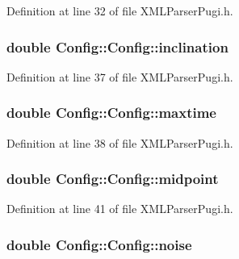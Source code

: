 Definition at line 32 of file XMLParserPugi.h.

\hypertarget{classConfig_1_1Config_adb71ce5d055b439fa0c3641c6400327e}{
\subsubsection[{inclination}]{\setlength{\rightskip}{0pt plus 5cm}double {\bf Config::Config::inclination}}}
\label{classConfig_1_1Config_adb71ce5d055b439fa0c3641c6400327e}


Definition at line 37 of file XMLParserPugi.h.

\hypertarget{classConfig_1_1Config_a3dcb214d120167f7bb6902892942d831}{
\subsubsection[{maxtime}]{\setlength{\rightskip}{0pt plus 5cm}double {\bf Config::Config::maxtime}}}
\label{classConfig_1_1Config_a3dcb214d120167f7bb6902892942d831}


Definition at line 38 of file XMLParserPugi.h.

\hypertarget{classConfig_1_1Config_ada14b015b08c65e217d223fead656748}{
\subsubsection[{midpoint}]{\setlength{\rightskip}{0pt plus 5cm}double {\bf Config::Config::midpoint}}}
\label{classConfig_1_1Config_ada14b015b08c65e217d223fead656748}


Definition at line 41 of file XMLParserPugi.h.

\hypertarget{classConfig_1_1Config_a0e9e59c906c710bb12efe8a620502109}{
\subsubsection[{noise}]{\setlength{\rightskip}{0pt plus 5cm}double {\bf Config::Config::noise}}}
\label{classConfig_1_1Config_a0e9e59c906c710bb12efe8a620502109}


